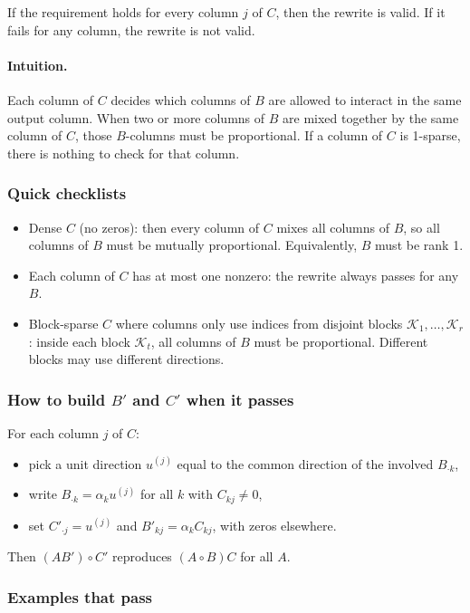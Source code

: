 \documentclass[11pt,a4paper]{article}
\theoremstyle{definition}
\newcommand{\Had}{\circ}
\begin{document}
If the requirement holds for every column $j$ of $C$, then the rewrite is valid. If it fails for any column, the rewrite is not valid.

\paragraph{Intuition.}
Each column of $C$ decides which columns of $B$ are allowed to interact in the same output column. When two or more columns of $B$ are mixed together by the same column of $C$, those $B$-columns must be proportional. If a column of $C$ is 1-sparse, there is nothing to check for that column.

\subsubsection*{Quick checklists}
\begin{itemize}
  \item Dense $C$ (no zeros): then every column of $C$ mixes all columns of $B$, so all columns of $B$ must be mutually proportional. Equivalently, $B$ must be rank 1.
  \item Each column of $C$ has at most one nonzero: the rewrite always passes for any $B$.
  \item Block-sparse $C$ where columns only use indices from disjoint blocks $\mathcal{K}_1,\dots,\mathcal{K}_r$: inside each block $\mathcal{K}_t$, all columns of $B$ must be proportional. Different blocks may use different directions.
\end{itemize}

\subsubsection*{How to build $B'$ and $C'$ when it passes}
For each column $j$ of $C$:
\begin{itemize}
  \item pick a unit direction $u^{(j)}$ equal to the common direction of the involved $B_{\cdot k}$,
  \item write $B_{\cdot k}=\alpha_k u^{(j)}$ for all $k$ with $C_{k j}\ne 0$,
  \item set $C'_{\cdot j}=u^{(j)}$ and $B'_{k j}=\alpha_k C_{k j}$, with zeros elsewhere.
\end{itemize}
Then $(A B') \Had C'$ reproduces $(A \Had B) C$ for all $A$.

\subsubsection*{Examples that pass}
\end{document}
